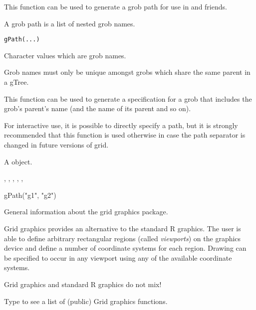 %
\begin{Description}\relax
This function can be used to generate a grob path for use
in  and friends.

A grob path is a list of nested grob names.
\end{Description}
%
\begin{Usage}
\begin{verbatim}
gPath(...)
\end{verbatim}
\end{Usage}
%
\begin{Arguments}
\begin{ldescription}
\item[\code{...}]  Character values which are grob names. 
\end{ldescription}
\end{Arguments}
%
\begin{Details}\relax
Grob names must only be unique amongst grobs which
share the same parent in a gTree.

This function can be used to generate a specification for
a grob that includes the grob's parent's name
(and the name of its parent and so on).

For interactive use, it is possible to directly specify
a path, but it is strongly recommended that this function
is used otherwise in case the path separator is changed
in future versions of grid.
\end{Details}
%
\begin{Value}
A  object.
\end{Value}
%
\begin{SeeAlso}\relax
{},
,
,
,
,
\end{SeeAlso}
%
\begin{Examples}
\begin{ExampleCode}
gPath("g1", "g2")
\end{ExampleCode}
\end{Examples}
%
\begin{Description}\relax
General information about the grid graphics package.
\end{Description}
%
\begin{Details}\relax
Grid graphics provides an alternative to the standard R graphics.
The user is able to define arbitrary rectangular regions (called
\emph{viewports}) on the graphics device and define a number of
coordinate systems for each region.  Drawing can be specified to occur
in any viewport using any of the available coordinate systems.

Grid graphics and standard R graphics do not mix!

Type  to see a list of (public)
Grid graphics functions.
\end{Details}
